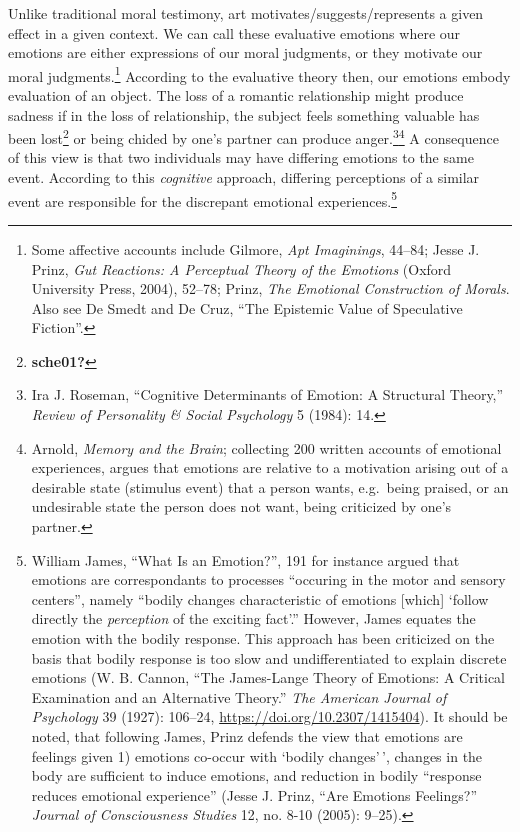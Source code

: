 \documentclass[phdthesis,12pt,final]{wuthesis}
\theoremstyle{definition}
\theoremstyle{definition}
\theoremstyle{definition}
\theoremstyle{definition}
\theoremstyle{remark}
\begin{document}
Unlike traditional moral testimony, art motivates/suggests/represents a given effect in a given context. We can call these evaluative emotions where our emotions are either expressions of our moral judgments, or they motivate our moral judgments.\footnote{Some affective accounts include Gilmore, \emph{Apt {Imaginings}}, 44--84; Jesse J. Prinz, \emph{Gut {Reactions}: {A Perceptual Theory} of the {Emotions}} (Oxford University Press, 2004), 52--78; Prinz, \emph{The {Emotional Construction} of {Morals}}. Also see De Smedt and De Cruz, {``The Epistemic Value of Speculative Fiction''}.} According to the evaluative theory then, our emotions embody evaluation of an object. The loss of a romantic relationship might produce sadness if in the loss of relationship, the subject feels something valuable has been lost\footnote{\textbf{sche01?}} or being chided by one's partner can produce anger.\footnote{Ira J. Roseman, {``Cognitive Determinants of Emotion: {A} Structural Theory,''} \emph{Review of Personality \& Social Psychology} 5 (1984): 14.}\footnote{Arnold, \emph{Memory and the Brain}; collecting 200 written accounts of emotional experiences, argues that emotions are relative to a motivation arising out of a desirable state (stimulus event) that a person wants, e.g.~being praised, or an undesirable state the person does not want, being criticized by one's partner.} A consequence of this view is that two individuals may have differing emotions to the same event. According to this \emph{cognitive} approach, differing perceptions of a similar event are responsible for the discrepant emotional experiences.\footnote{William James, {``What Is an Emotion?''}, 191 for instance argued that emotions are correspondants to processes ``occuring in the motor and sensory centers'', namely ``bodily changes characteristic of emotions {[}which{]} `follow directly the \emph{perception} of the exciting fact'.'' However, James equates the emotion with the bodily response. This approach has been criticized on the basis that bodily response is too slow and undifferentiated to explain discrete emotions (W. B. Cannon, {``The {James-Lange} Theory of Emotions: A Critical Examination and an Alternative Theory.''} \emph{The American Journal of Psychology} 39 (1927): 106--24, \url{https://doi.org/10.2307/1415404}). It should be noted, that following James, Prinz defends the view that emotions are feelings given 1) emotions co-occur with `bodily changes'\,', changes in the body are sufficient to induce emotions, and reduction in bodily ``response reduces emotional experience'' (Jesse J. Prinz, {``Are Emotions Feelings?''} \emph{Journal of Consciousness Studies} 12, no. 8-10 (2005): 9--25).}
\end{document}
